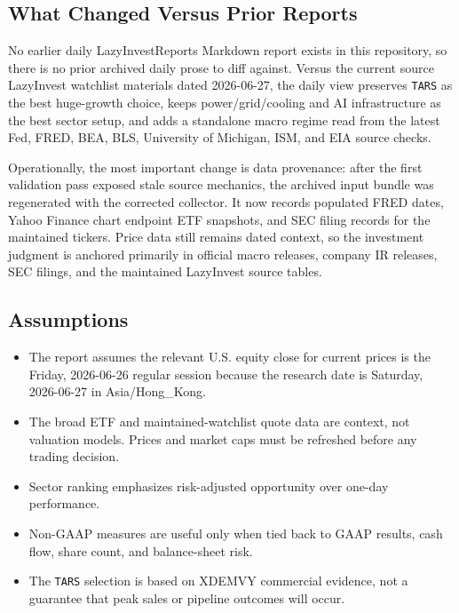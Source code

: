 \documentclass[
  9pt,
]{article}
\providecommand{\tightlist}{%
  \setlength{\itemsep}{0pt}\setlength{\parskip}{0pt}}
\begin{document}
\hypertarget{what-changed-versus-prior-reports}{%
\subsection{What Changed Versus Prior
Reports}\label{what-changed-versus-prior-reports}}

No earlier daily LazyInvestReports Markdown report exists in this
repository, so there is no prior archived daily prose to diff against.
Versus the current source LazyInvest watchlist materials dated
2026-06-27, the daily view preserves \texttt{TARS} as the best
huge-growth choice, keeps power/grid/cooling and AI infrastructure as
the best sector setup, and adds a standalone macro regime read from the
latest Fed, FRED, BEA, BLS, University of Michigan, ISM, and EIA source
checks.

Operationally, the most important change is data provenance: after the
first validation pass exposed stale source mechanics, the archived input
bundle was regenerated with the corrected collector. It now records
populated FRED dates, Yahoo Finance chart endpoint ETF snapshots, and
SEC filing records for the maintained tickers. Price data still remains
dated context, so the investment judgment is anchored primarily in
official macro releases, company IR releases, SEC filings, and the
maintained LazyInvest source tables.

\hypertarget{assumptions}{%
\subsection{Assumptions}\label{assumptions}}

\begin{itemize}
\tightlist
\item
  The report assumes the relevant U.S. equity close for current prices
  is the Friday, 2026-06-26 regular session because the research date is
  Saturday, 2026-06-27 in Asia/Hong\_Kong.
\item
  The broad ETF and maintained-watchlist quote data are context, not
  valuation models. Prices and market caps must be refreshed before any
  trading decision.
\item
  Sector ranking emphasizes risk-adjusted opportunity over one-day
  performance.
\item
  Non-GAAP measures are useful only when tied back to GAAP results, cash
  flow, share count, and balance-sheet risk.
\item
  The \texttt{TARS} selection is based on XDEMVY commercial evidence,
  not a guarantee that peak sales or pipeline outcomes will occur.
\end{itemize}
\end{document}
